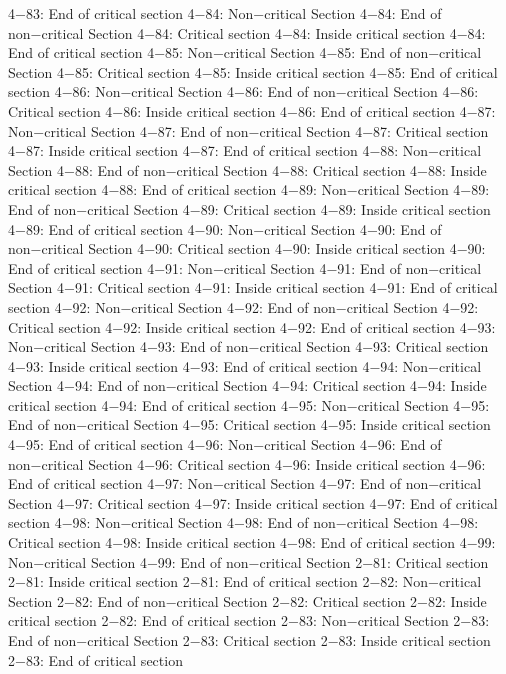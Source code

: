 4−83: End of critical section
4−84: Non−critical Section
4−84: End of non−critical Section
4−84: Critical section
4−84: Inside critical section
4−84: End of critical section
4−85: Non−critical Section
4−85: End of non−critical Section
4−85: Critical section
4−85: Inside critical section
4−85: End of critical section
4−86: Non−critical Section
4−86: End of non−critical Section
4−86: Critical section
4−86: Inside critical section
4−86: End of critical section
4−87: Non−critical Section
4−87: End of non−critical Section
4−87: Critical section
4−87: Inside critical section
4−87: End of critical section
4−88: Non−critical Section
4−88: End of non−critical Section
4−88: Critical section
4−88: Inside critical section
4−88: End of critical section
4−89: Non−critical Section
4−89: End of non−critical Section
4−89: Critical section
4−89: Inside critical section
4−89: End of critical section
4−90: Non−critical Section
4−90: End of non−critical Section
4−90: Critical section
4−90: Inside critical section
4−90: End of critical section
4−91: Non−critical Section
4−91: End of non−critical Section
4−91: Critical section
4−91: Inside critical section
4−91: End of critical section
4−92: Non−critical Section
4−92: End of non−critical Section
4−92: Critical section
4−92: Inside critical section
4−92: End of critical section
4−93: Non−critical Section
4−93: End of non−critical Section
4−93: Critical section
4−93: Inside critical section
4−93: End of critical section
4−94: Non−critical Section
4−94: End of non−critical Section
4−94: Critical section
4−94: Inside critical section
4−94: End of critical section
4−95: Non−critical Section
4−95: End of non−critical Section
4−95: Critical section
4−95: Inside critical section
4−95: End of critical section
4−96: Non−critical Section
4−96: End of non−critical Section
4−96: Critical section
4−96: Inside critical section
4−96: End of critical section
4−97: Non−critical Section
4−97: End of non−critical Section
4−97: Critical section
4−97: Inside critical section
4−97: End of critical section
4−98: Non−critical Section
4−98: End of non−critical Section
4−98: Critical section
4−98: Inside critical section
4−98: End of critical section
4−99: Non−critical Section
4−99: End of non−critical Section
2−81: Critical section
2−81: Inside critical section
2−81: End of critical section
2−82: Non−critical Section
2−82: End of non−critical Section
2−82: Critical section
2−82: Inside critical section
2−82: End of critical section
2−83: Non−critical Section
2−83: End of non−critical Section
2−83: Critical section
2−83: Inside critical section
2−83: End of critical section
